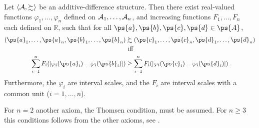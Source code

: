 \begin{thm}\label{thm-repr-add-diff-struct} 
  Let \(\langle \mathcal{A}, \succsim \rangle\) be an additive-difference structure.  
  Then there exist real-valued functions \(\varphi_1, \ldots, \varphi_n\) defined on \(\mathcal{A}_1, \ldots, \mathcal{A}_n\), and increasing functions \(F_1, \ldots, F_n\) each defined on \(\mathbb{R}\), such that for all \(\ps{a}, \ps{b}, \ps{c}, \ps{d} \in \ps{A}\),  
\begin{align*}
  (\ps{a}_1, \ldots, \ps{a}_n, \ps{b}_1, \ldots, \ps{b}_n) &\succsim (\ps{c}_1, \ldots, \ps{c}_n, \ps{d}_1, \ldots, \ps{d}_n) \\
                                                           &\text{ iff } \\
  \sum_{i=1}^{n} F_i(|\varphi_i(\ps{a}_i) - \varphi_i(\ps{b}_i)|) &\geq \sum_{i=1}^{n} F_i(|\varphi_i(\ps{c}_i) - \varphi_i(\ps{d}_i)|).
\end{align*}
Furthermore, the \(\varphi_i\) are interval scales, and the \(F_i\) are interval scales with a common unit (\(i = 1, \ldots, n\)).
\end{thm}



\begin{rem}
  For $n=2$ another axiom, the Thomsen condition, must be assumed. For $n \geq 3$ this conditions follows from the other axioms, see \textcite[pp. 182-184]{foundations2}.
\end{rem}
